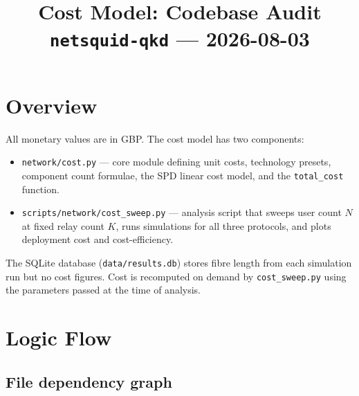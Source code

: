 \documentclass[12pt,a4paper]{article}
\title{\textbf{Cost Model: Codebase Audit}\\[0.4em]
  \large \texttt{netsquid-qkd} --- 2026-08-03}
\author{}
\date{}
\begin{document}
\maketitle
\tableofcontents
\newpage

\section{Overview}

All monetary values are in GBP. The cost model has two components:

\begin{itemize}
  \item \texttt{network/cost.py} --- core module defining unit costs, technology
        presets, component count formulae, the SPD linear cost model, and the
        \texttt{total\_cost} function.
  \item \texttt{scripts/network/cost\_sweep.py} --- analysis script that sweeps
        user count $N$ at fixed relay count $K$, runs simulations for all three
        protocols, and plots deployment cost and cost-efficiency.
\end{itemize}

The SQLite database (\texttt{data/results.db}) stores fibre length from each
simulation run but no cost figures. Cost is recomputed on demand by
\texttt{cost\_sweep.py} using the parameters passed at the time of analysis.

\section{Logic Flow}

\subsection{File dependency graph}
\end{document}
